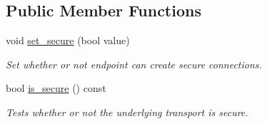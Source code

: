 \subsection*{Public Member Functions}
\begin{DoxyCompactItemize}
\item 
void \mbox{\hyperlink{classwebsocketpp_1_1transport_1_1stub_1_1endpoint_a5e7ffca4157517d74c6f433e016f05e8}{set\+\_\+secure}} (bool value)
\begin{DoxyCompactList}\small\item\em Set whether or not endpoint can create secure connections. \end{DoxyCompactList}\item 
bool \mbox{\hyperlink{classwebsocketpp_1_1transport_1_1stub_1_1endpoint_a57f9ac746c580cacc374b49889e514f7}{is\+\_\+secure}} () const
\begin{DoxyCompactList}\small\item\em Tests whether or not the underlying transport is secure. \end{DoxyCompactList}\end{DoxyCompactItemize}
